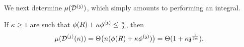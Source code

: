 \medskip
We next determine $\mu(\dt)$, which simply amounts to performing an integral. %
\begin{lemma}\label{lem:radialmeasure}
If  $\kappa\ge 1$ are such that $\phi(R)+\kappa\phis\le\frac{\pi}{2}$, then  %
\[
\mu(\dt(\kappa)) = \Theta\big(n(\phi(R)+\kappa\phi^{(\ss)})\big) = \Theta(\mkor{\nu(1+\kappa\ss^{\frac{1}{2\alpha}})}{1+\kappa\ss^{\frac{1}{2\alpha}}}).
\]
\end{lemma}
